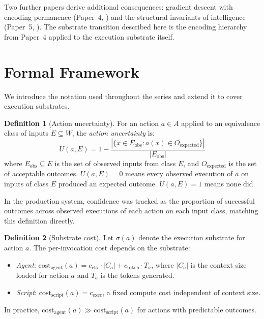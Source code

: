 \documentclass[11pt]{article}
\theoremstyle{definition}
\newtheorem{definition}{Definition}
\begin{document}
Two further papers derive additional consequences: gradient descent
with encoding permanence (Paper~4, \cite{McCarthy2026d}) and the
structural invariants of intelligence (Paper~5, \cite{McCarthy2026e}).
The substrate transition described here is the encoding hierarchy from
Paper~4 applied to the execution substrate itself.

\section{Formal Framework}
\label{sec:framework}

We introduce the notation used throughout the series and extend it
to cover execution substrates.

\begin{definition}[Action uncertainty]
\label{def:uncertainty}
For an action $a \in A$ applied to an equivalence class of inputs
$E \subseteq W$, the \emph{action uncertainty} is:
\[
U(a, E) = 1 - \frac{|\{x \in E_{\text{obs}} : a(x) \in O_{\text{expected}}\}|}{|E_{\text{obs}}|}
\]
where $E_{\text{obs}} \subseteq E$ is the set of observed inputs from
class $E$, and $O_{\text{expected}}$ is the set of acceptable outcomes.
$U(a, E) = 0$ means every observed execution of $a$ on inputs of class
$E$ produced an expected outcome. $U(a, E) = 1$ means none did.
\end{definition}

In the production system, confidence was tracked as the proportion of
successful outcomes across observed executions of each action on each
input class, matching this definition directly.

\begin{definition}[Substrate cost]
\label{def:substrate-cost}
Let $\sigma(a)$ denote the execution substrate for action $a$. The
per-invocation cost depends on the substrate:
\begin{itemize}
\item \emph{Agent}: $\text{cost}_{\text{agent}}(a) = c_{\text{ctx}}
   \cdot |C_a| + c_{\text{token}} \cdot T_a$, where $|C_a|$ is the
   context size loaded for action $a$ and $T_a$ is the tokens generated.
\item \emph{Script}: $\text{cost}_{\text{script}}(a) = c_{\text{exec}}$,
   a fixed compute cost independent of context size.
\end{itemize}
In practice, $\text{cost}_{\text{agent}}(a) \gg
\text{cost}_{\text{script}}(a)$ for actions with predictable outcomes.
\end{definition}
\end{document}
